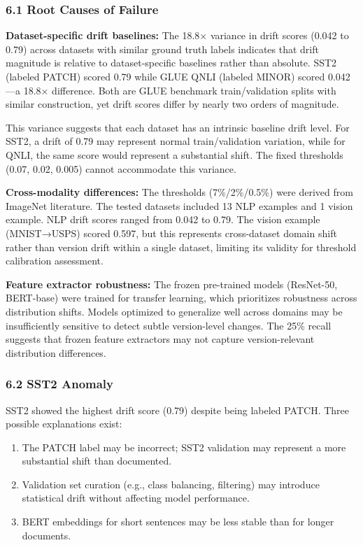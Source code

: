 
\subsubsection{6.1 Root Causes of Failure}

\textbf{Dataset-specific drift baselines:} The 18.8× variance in drift scores (0.042 to 0.79) across datasets with similar ground truth labels indicates that drift magnitude is relative to dataset-specific baselines rather than absolute. SST2 (labeled PATCH) scored 0.79 while GLUE QNLI (labeled MINOR) scored 0.042—a 18.8× difference. Both are GLUE benchmark train/validation splits with similar construction, yet drift scores differ by nearly two orders of magnitude.

This variance suggests that each dataset has an intrinsic baseline drift level. For SST2, a drift of 0.79 may represent normal train/validation variation, while for QNLI, the same score would represent a substantial shift. The fixed thresholds (0.07, 0.02, 0.005) cannot accommodate this variance.

\textbf{Cross-modality differences:} The thresholds (7\%/2\%/0.5\%) were derived from ImageNet literature. The tested datasets included 13 NLP examples and 1 vision example. NLP drift scores ranged from 0.042 to 0.79. The vision example (MNIST→USPS) scored 0.597, but this represents cross-dataset domain shift rather than version drift within a single dataset, limiting its validity for threshold calibration assessment.

\textbf{Feature extractor robustness:} The frozen pre-trained models (ResNet-50, BERT-base) were trained for transfer learning, which prioritizes robustness across distribution shifts. Models optimized to generalize well across domains may be insufficiently sensitive to detect subtle version-level changes. The 25\% recall suggests that frozen feature extractors may not capture version-relevant distribution differences.

\subsubsection{6.2 SST2 Anomaly}

SST2 showed the highest drift score (0.79) despite being labeled PATCH. Three possible explanations exist:

\begin{enumerate}
\item The PATCH label may be incorrect; SST2 validation may represent a more substantial shift than documented.
\item Validation set curation (e.g., class balancing, filtering) may introduce statistical drift without affecting model performance.
\item BERT embeddings for short sentences may be less stable than for longer documents.
\end{enumerate}

